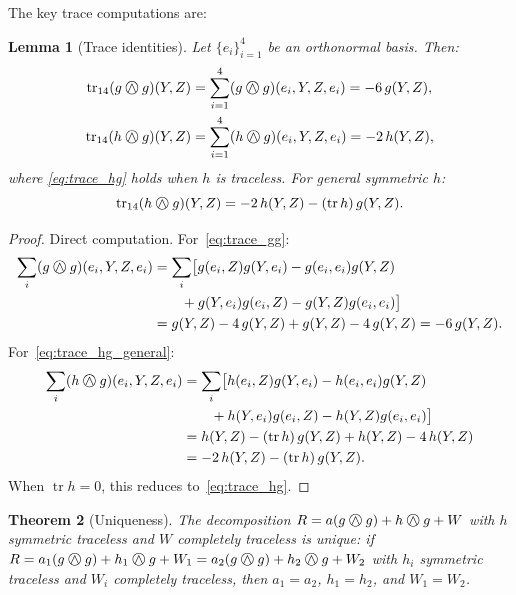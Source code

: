 \documentclass[11pt,a4paper]{article}
\newcommand{\owedge}{\mathbin{%
  \text{%
    \ooalign{%
      \hfil$\wedge$\hfil\cr
      \hfil\raisebox{0.05em}{$\bigcirc$}\hfil\cr
    }%
  }%
}}
\newtheorem{theorem}{Theorem}[section]
\newtheorem{lemma}[theorem]{Lemma}
\begin{document}
The key trace computations are:

\begin{lemma}[Trace identities]
\label{lem:traces}
Let $\{e_i\}_{i=1}^4$ be an orthonormal basis. Then:
\begin{align}
  \operatorname{tr}_{14}(g \owedge g)(Y,Z)
    &= \sum_{i=1}^4 (g \owedge g)(e_i, Y, Z, e_i) = -6\,g(Y,Z),
    \label{eq:trace_gg}\\
  \operatorname{tr}_{14}(h \owedge g)(Y,Z)
    &= \sum_{i=1}^4 (h \owedge g)(e_i, Y, Z, e_i) = -2\,h(Y,Z),
    \label{eq:trace_hg}
\end{align}
where \eqref{eq:trace_hg} holds when $h$ is traceless.
For general symmetric $h$:
\begin{equation}
  \operatorname{tr}_{14}(h \owedge g)(Y,Z)
    = -2\,h(Y,Z) - (\operatorname{tr} h)\,g(Y,Z).
  \label{eq:trace_hg_general}
\end{equation}
\end{lemma}

\begin{proof}
Direct computation. For~\eqref{eq:trace_gg}:
\begin{align*}
  \sum_i (g\owedge g)(e_i,Y,Z,e_i)
  &= \sum_i \bigl[g(e_i,Z)g(Y,e_i) - g(e_i,e_i)g(Y,Z)\\
  &\qquad + g(Y,e_i)g(e_i,Z) - g(Y,Z)g(e_i,e_i)\bigr]\\
  &= g(Y,Z) - 4\,g(Y,Z) + g(Y,Z) - 4\,g(Y,Z) = -6\,g(Y,Z).
\end{align*}
For~\eqref{eq:trace_hg_general}:
\begin{align*}
  \sum_i (h\owedge g)(e_i,Y,Z,e_i)
  &= \sum_i \bigl[h(e_i,Z)g(Y,e_i) - h(e_i,e_i)g(Y,Z)\\
  &\qquad + h(Y,e_i)g(e_i,Z) - h(Y,Z)g(e_i,e_i)\bigr]\\
  &= h(Y,Z) - (\operatorname{tr}h)\,g(Y,Z) + h(Y,Z) - 4\,h(Y,Z) \\
  &= -2\,h(Y,Z) - (\operatorname{tr}h)\,g(Y,Z).
\end{align*}
When $\operatorname{tr}h = 0$, this reduces to~\eqref{eq:trace_hg}.
\end{proof}

\begin{theorem}[Uniqueness]
\label{thm:decomp_unique}
The decomposition $R = a(g \owedge g) + h \owedge g + W$
with $h$ symmetric traceless and $W$ completely traceless is unique:
if $R = a_1(g \owedge g) + h_1 \owedge g + W_1 = a_2(g \owedge g) + h_2 \owedge g + W_2$
with $h_i$ symmetric traceless and $W_i$ completely traceless, then
$a_1 = a_2$, $h_1 = h_2$, and $W_1 = W_2$.
\end{theorem}
\end{document}
